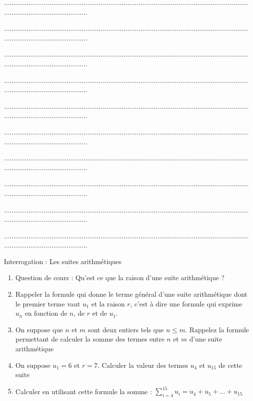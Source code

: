 \documentclass[10pt,a4paper]{exam}
\begin{document}
.............................................................................................................................................................................

.............................................................................................................................................................................

.............................................................................................................................................................................
 
.............................................................................................................................................................................

.............................................................................................................................................................................

.............................................................................................................................................................................

.............................................................................................................................................................................
 
.............................................................................................................................................................................

.............................................................................................................................................................................


.............................................................................................................................................................................

\newpage


Interrogation : Les suites arithmétiques
\begin{enumerate}
    \item Question de cours : Qu'est ce que la raison d'une suite arithmétique ?
    \item Rappeler la formule qui donne le terme général d'une suite arithmétique dont le premier terme vaut $u_1$ et la raison $r$, c'est à dire une formule qui exprime $u_n$ en fonction de $n$, de $r$ et de $u_1$.
    \item On suppose que $n$ et $m$ sont deux entiers tels que $n\leq m$.  Rappelez la formule permettant de calculer la somme des termes entre $n$ et $m$ d'une suite arithmétique
    \item On suppose $u_1 = 6$ et $r = 7$.  Calculer la valeur des termes $u_4$ et $u_{15}$ de cette suite
    \item Calculer en utilisant cette formule la somme :  $\sum_{i=4}^{15} u_i = u_4 + u_5 + ... + u_{15}$
\end{enumerate}
\end{document}
